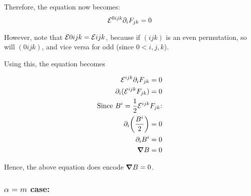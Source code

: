 Therefore, the equation now becomes:
\begin{align*}
    \mathcal{E}^{0 i j k}  \partial_{i} F_{j k} = 0
\end{align*}

However, note that $\mathcal{E}{0 i j k} = \mathcal{E}{i j k}$, because if
$(i j k)$ is an even permutation, so will $(0 i j k)$, and vice versa for odd
(since $0 < i, j, k$).

Using this, the equation becomes

\begin{align*}
    \mathcal{E}^{i j k}  \partial_{i} F_{j k} = 0 \\
    \partial_{i} ( \mathcal{E}^{i j k} F_{j k}) = 0 \\
    \text{Since $B^i = \frac{1}{2} \mathcal{E}^{ijk} F_{j k}$:} \\
    \partial_{i} \bigg( \frac{B^i}{2} \bigg) = 0 \\
    \partial_{i}  B^i = 0 \\
    \grad B = 0
\end{align*}

Hence, the above equation does encode $\grad B = 0$.

\subsubsection{$\alpha = m$ case:}


